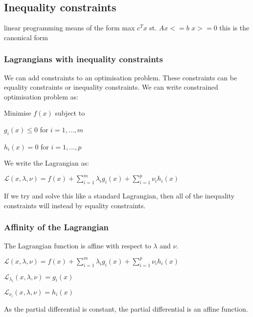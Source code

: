 
\subsection{Inequality constraints}

linear programming means of the form
max \(c^Tx\)
st. \(Ax<=b\)
\(x>=0\)
this is the canonical form

\subsubsection{Lagrangians with inequality constraints}

We can add constraints to an optimisation problem. These constraints can be equality constraints or inequality constraints. We can write constrained optimisation problem as:

Minimise \(f(x)\) subject to 

\(g_i(x)\le 0\) for \(i=1,...,m\)

\(h_i(x)=0\) for \(i=1,…,p\)

We write the Lagrangian as:

\(\mathcal{L}(x, \lambda, \nu )=f(x)+\sum_{i=1}^m\lambda_i g_i(x)+\sum_{i=1}^p\nu_ih_i(x)\)

If we try and solve this like a standard Lagrangian, then all of the inequality constraints will instead by equality constraints.

\subsubsection{Affinity of the Lagrangian}

The Lagrangian function is affine with respect to \(\lambda \) and \(\nu \).

\(\mathcal{L}(x, \lambda, \nu )=f(x)+\sum_{i=1}^m\lambda_i g_i(x)+\sum_{i=1}^p\nu_ih_i(x)\)

\(\mathcal{L}_{\lambda_i}(x, \lambda, \nu )=g_i(x)\)

\(\mathcal{L}_{\nu_i}(x, \lambda, \nu )=h_i(x)\)

As the partial differential is constant, the partial differential is an affine function.

